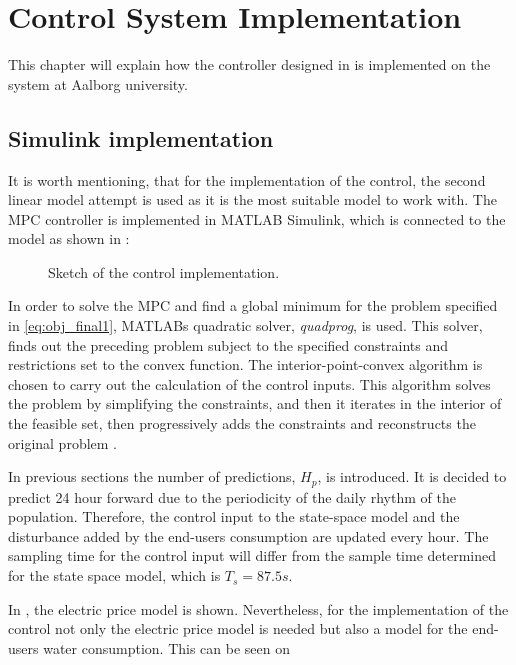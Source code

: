 \chapter{Control System Implementation}
\label{implementation_of_controller}

This chapter will explain how the controller designed in  is implemented on the system at Aalborg university.  

\section{Simulink implementation}
\label{simulink_intro}
It is worth mentioning, that for the implementation of the control, the second linear model attempt is used as it is the most suitable model to work with. The MPC controller is implemented in MATLAB Simulink, which is connected to the model as shown in :

\begin{figure}[H]
\centering
 
\caption{Sketch of the control implementation.}
\label{fig:control_sketch}
\end{figure}

In order to solve the MPC and find a global minimum for the problem specified in \eqref{eq:obj_final1},  MATLABs quadratic solver, \textit{quadprog}, is used. This solver, finds out the preceding problem subject to the specified constraints and restrictions set to the convex function. The interior-point-convex algorithm is chosen to carry out the calculation of the control inputs. This algorithm solves the problem by simplifying the constraints, and then it iterates in the interior of the feasible set, then progressively adds the constraints and reconstructs the original problem \cite{Convex_optimization}. 

In previous sections the number of predictions, $H_p$, is introduced. It is decided to predict 24 hour forward due to the periodicity of the daily rhythm of the population. Therefore, the control input to the state-space model and the disturbance added by the end-users consumption are updated every hour. The sampling time for the control input will differ from the sample time determined for the state space model, which is $T_s = 87.5s$. 

In , the electric price model is shown. Nevertheless, for the implementation of the control not only the electric price model is needed but also a model for the end-users water consumption. This can be seen on 

